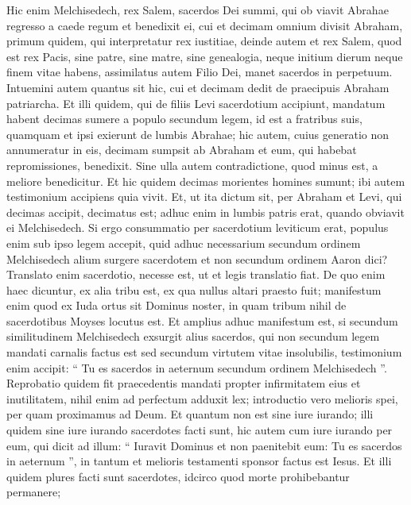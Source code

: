 \begin{biblechapter}
\begin{biblechapter}
\begin{biblechapter}
\begin{biblechapter}
\begin{biblechapter}
\begin{biblechapter}
\begin{biblechapter}
\verse Hic enim Melchisedech, rex Salem, sacerdos Dei summi, qui ob viavit Abrahae regresso a caede regum et benedixit ei, 
\verse cui et decimam omnium divisit Abraham, primum quidem, qui interpretatur rex iustitiae, deinde autem et rex Salem, quod est rex Pacis, 
\verse sine patre, sine matre, sine genealogia, neque initium dierum neque finem vitae habens, assimilatus autem Filio Dei, manet sacerdos in perpetuum.
 \verse Intuemini autem quantus sit hic, cui et decimam dedit de praecipuis Abraham patriarcha. 
\verse Et illi quidem, qui de filiis Levi sacerdotium accipiunt, mandatum habent decimas sumere a populo secundum legem, id est a fratribus suis, quamquam et ipsi exierunt de lumbis Abrahae; 
\verse hic autem, cuius generatio non annumeratur in eis, decimam sumpsit ab Abraham et eum, qui habebat repromissiones, benedixit. 
\verse Sine ulla autem contradictione, quod minus est, a meliore benedicitur.
 \verse Et hic quidem decimas morientes homines sumunt; ibi autem testimonium accipiens quia vivit. 
\verse Et, ut ita dictum sit, per Abraham et Levi, qui decimas accipit, decimatus est; 
\verse adhuc enim in lumbis patris erat, quando obviavit ei Melchisedech.
 \verse Si ergo consummatio per sacerdotium leviticum erat, populus enim sub ipso legem accepit, quid adhuc necessarium secundum ordinem Melchisedech alium surgere sacerdotem et non secundum ordinem Aaron dici? 
\verse Translato enim sacerdotio, necesse est, ut et legis translatio fiat. 
\verse De quo enim haec dicuntur, ex alia tribu est, ex qua nullus altari praesto fuit; 
\verse manifestum enim quod ex Iuda ortus sit Dominus noster, in quam tribum nihil de sacerdotibus Moyses locutus est.
 \verse Et amplius adhuc manifestum est, si secundum similitudinem Melchisedech exsurgit alius sacerdos, 
\verse qui non secundum legem mandati carnalis factus est sed secundum virtutem vitae insolubilis, 
\verse testimonium enim accipit:
 “ Tu es sacerdos in aeternum secundum ordinem Melchisedech ”.
 \verse Reprobatio quidem fit praecedentis mandati propter infirmitatem eius et inutilitatem, 
\verse nihil enim ad perfectum adduxit lex; introductio vero melioris spei, per quam proximamus ad Deum.
 \verse Et quantum non est sine iure iurando; illi quidem sine iure iurando sacerdotes facti sunt, 
\verse hic autem cum iure iurando per eum, qui dicit ad illum:
 “ Iuravit Dominus et non paenitebit eum: Tu es sacerdos in aeternum ”,
 \verse in tantum et melioris testamenti sponsor factus est Iesus.
 \verse Et illi quidem plures facti sunt sacerdotes, idcirco quod morte prohibebantur permanere; 

\end{biblechapter}
\end{biblechapter}
\end{biblechapter}
\end{biblechapter}
\end{biblechapter}
\end{biblechapter}
\end{biblechapter}
